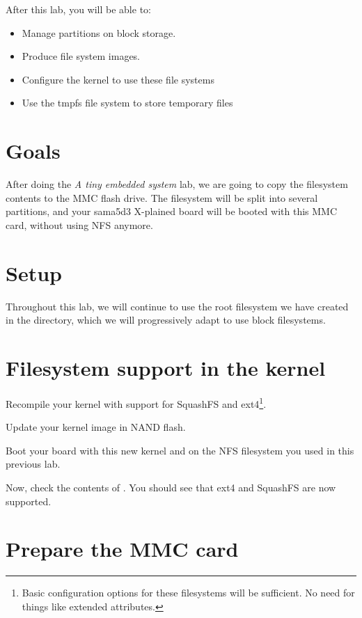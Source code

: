 
After this lab, you will be able to:
\begin{itemize}
\item Manage partitions on block storage.
\item Produce file system images.
\item Configure the kernel to use these file systems
\item Use the tmpfs file system to store temporary files
\end{itemize}

\section{Goals}

After doing the {\em A tiny embedded system} lab, we are going to copy
the filesystem contents to the MMC flash drive. The filesystem will be
split into several partitions, and your sama5d3 X-plained board will
be booted with this MMC card, without using NFS anymore.

\section{Setup}

Throughout this lab, we will continue to use the root filesystem we
have created in the 
directory, which we will progressively adapt to use block filesystems.

\section{Filesystem support in the kernel}

Recompile your kernel with support for SquashFS and ext4\footnote{Basic
configuration options for these filesystems will be sufficient. No need
for things like extended attributes.}.

Update your kernel image in NAND flash.

Boot your board with this new kernel and on the NFS filesystem you
used in this previous lab.

Now, check the contents of . You should see
 that ext4 and SquashFS are now supported.

\section{Prepare the MMC card}

